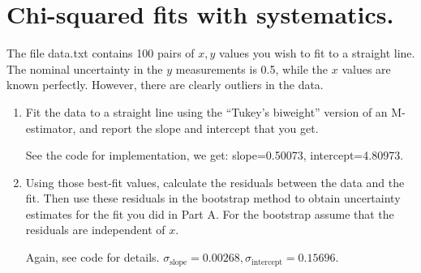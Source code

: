 \section{Chi-squared fits with systematics.}

The file data.txt contains 100 pairs of $x, y$ values you wish to fit to a straight line. The nominal uncertainty in the $y$ measurements is 0.5, while the $x$ values are known perfectly. However, there are clearly outliers in the data.

\begin{enumerate}[label=\textbf{\Alph*}.]
    \item Fit the data to a straight line using the ``Tukey's biweight'' version of an M-estimator, and report the slope and intercept that you get.
    
    See the code for implementation, we get: slope=0.50073, intercept=4.80973.

    \item Using those best-fit values, calculate the residuals between the data and the fit. Then use these residuals in the bootstrap method to obtain uncertainty estimates for the fit you did in Part A. For the bootstrap assume that the residuals are independent of $x$.

    Again, see code for details. $\sigma_{\text{slope}}=0.00268, \sigma_{\text{intercept}}=0.15696$.

\end{enumerate}
